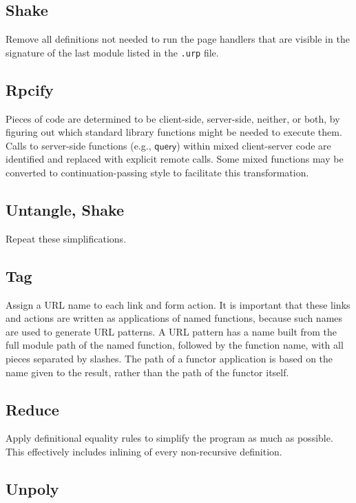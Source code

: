 \documentclass{article}
\newcommand{\mt}[1]{\mathsf{#1}}
\begin{document}
\subsection{Shake}

Remove all definitions not needed to run the page handlers that are visible in the signature of the last module listed in the \texttt{.urp} file.

\subsection{Rpcify}

Pieces of code are determined to be client-side, server-side, neither, or both, by figuring out which standard library functions might be needed to execute them.  Calls to server-side functions (e.g., $\mt{query}$) within mixed client-server code are identified and replaced with explicit remote calls.  Some mixed functions may be converted to continuation-passing style to facilitate this transformation.

\subsection{Untangle, Shake}

Repeat these simplifications.

\subsection{\label{tag}Tag}

Assign a URL name to each link and form action.  It is important that these links and actions are written as applications of named functions, because such names are used to generate URL patterns.  A URL pattern has a name built from the full module path of the named function, followed by the function name, with all pieces separated by slashes.  The path of a functor application is based on the name given to the result, rather than the path of the functor itself.

\subsection{Reduce}

Apply definitional equality rules to simplify the program as much as possible.  This effectively includes inlining of every non-recursive definition.

\subsection{Unpoly}
\end{document}
